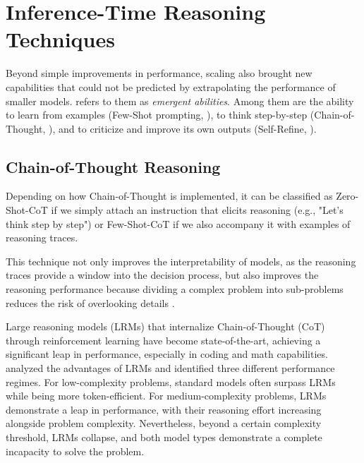 \section{Inference-Time Reasoning Techniques} \label{sec:single-agent}

Beyond simple improvements in performance, scaling also brought new capabilities that could not be predicted by extrapolating the performance of smaller models. \textcite{wei2022emergentabilitieslargelanguage} refers to them as \textit{emergent abilities}. Among them are the ability to learn from examples (Few-Shot prompting, \cite{NEURIPS2020_1457c0d6}), to think step-by-step (Chain-of-Thought, \cite{wei_chain--thought_2023}), and to criticize and improve its own outputs (Self-Refine, \cite{madaan_self-refine_2023}).

\subsection{Chain-of-Thought Reasoning} \label{sec:cot}

Depending on how Chain-of-Thought is implemented, it can be classified as Zero-Shot-CoT \parencite{kojima2023largelanguagemodelszeroshot} if we simply attach an instruction that elicits reasoning (e.g., "Let's think step by step") or Few-Shot-CoT \parencite{wei_chain--thought_2023} if we also accompany it with examples of reasoning traces. 

This technique not only improves the interpretability of models, as the reasoning traces provide a window into the decision process, but also improves the reasoning performance because dividing a complex problem into sub-problems reduces the risk of overlooking details \parencite{zhang2023ignitinglanguageintelligencehitchhikers}.

Large reasoning models (LRMs) that internalize Chain-of-Thought (CoT) through reinforcement learning \parencite{openai2024openaio1card, Guo_2025} have become state-of-the-art, achieving a significant leap in performance, especially in coding and math capabilities. \textcite{shojaee2025illusionthinkingunderstandingstrengths} analyzed the advantages of LRMs and identified three different performance regimes. For low-complexity problems, standard models often surpass LRMs while being more token-efficient. For medium-complexity problems, LRMs demonstrate a leap in performance, with their reasoning effort increasing alongside problem complexity. Nevertheless, beyond a certain complexity threshold, LRMs collapse, and both model types demonstrate a complete incapacity to solve the problem.

